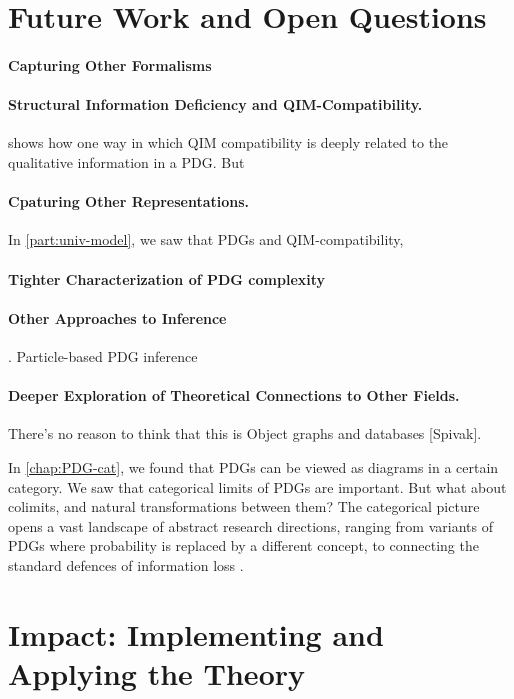 \section{Future Work and Open Questions}

\paragraph{Capturing Other Formalisms}

\paragraph{Structural Information Deficiency and QIM-Compatibility.}
 shows how one way in which QIM compatibility is deeply related to the qualitative information in a PDG.
But 

\paragraph{Cpaturing Other Representations.}
In \cref{part:univ-model}, we saw that PDGs and QIM-compatibility,


\paragraph{Tighter Characterization of PDG complexity}

\paragraph{Other Approaches to Inference}. 
 Particle-based PDG inference


\paragraph{Deeper Exploration of Theoretical Connections to Other Fields.}
There's no reason to think that this is 
Object graphs and databases [Spivak].

In \cref{chap:PDG-cat}, we found that PDGs can be viewed as diagrams in a certain category. We saw that categorical limits of PDGs are important. But what about colimits, and natural transformations between them? 
The categorical picture opens a vast landscape of abstract research directions, ranging from variants of PDGs where probability is replaced by a different concept, to connecting the standard defences of information loss \citep[Theorem ??]{leinster2021entropy}.


\section{Impact: Implementing and Applying the Theory}

